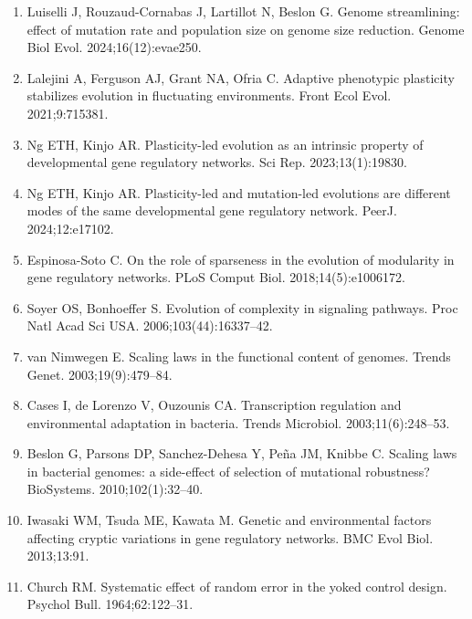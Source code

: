 \begin{enumerate}
\item Luiselli J, Rouzaud-Cornabas J, Lartillot N, Beslon G. Genome streamlining: effect of mutation rate and population size on genome size reduction. Genome Biol Evol. 2024;16(12):evae250.
\item Lalejini A, Ferguson AJ, Grant NA, Ofria C. Adaptive phenotypic plasticity stabilizes evolution in fluctuating environments. Front Ecol Evol. 2021;9:715381.
\item Ng ETH, Kinjo AR. Plasticity-led evolution as an intrinsic property of developmental gene regulatory networks. Sci Rep. 2023;13(1):19830.
\item Ng ETH, Kinjo AR. Plasticity-led and mutation-led evolutions are different modes of the same developmental gene regulatory network. PeerJ. 2024;12:e17102.
\item Espinosa-Soto C. On the role of sparseness in the evolution of modularity in gene regulatory networks. PLoS Comput Biol. 2018;14(5):e1006172.
\item Soyer OS, Bonhoeffer S. Evolution of complexity in signaling pathways. Proc Natl Acad Sci USA. 2006;103(44):16337--42.
\item van Nimwegen E. Scaling laws in the functional content of genomes. Trends Genet. 2003;19(9):479--84.
\item Cases I, de Lorenzo V, Ouzounis CA. Transcription regulation and environmental adaptation in bacteria. Trends Microbiol. 2003;11(6):248--53.
\item Beslon G, Parsons DP, Sanchez-Dehesa Y, Pe\~na JM, Knibbe C. Scaling laws in bacterial genomes: a side-effect of selection of mutational robustness? BioSystems. 2010;102(1):32--40.
\item Iwasaki WM, Tsuda ME, Kawata M. Genetic and environmental factors affecting cryptic variations in gene regulatory networks. BMC Evol Biol. 2013;13:91.
\item Church RM. Systematic effect of random error in the yoked control design. Psychol Bull. 1964;62:122--31.
\end{enumerate}


